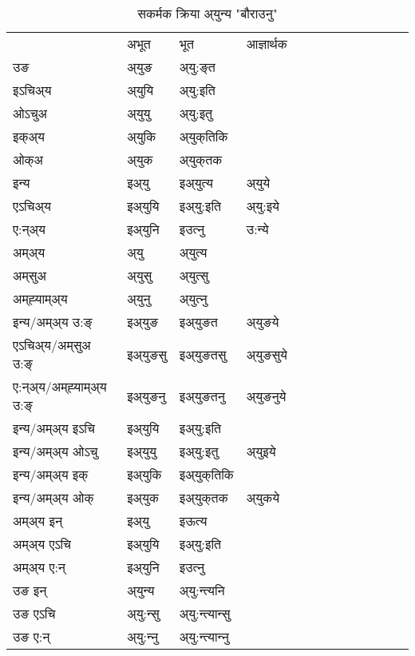 \begin{table}[H]
\centering
\caption{\label{u.vt} सकर्मक क्रिया  अ्युन्य  "बौराउनु"  }
\begin{tabular}{l|l|l|l|l|l|l|l|l|l|l|l|l}  \toprule
&अभूत & भूत & आज्ञार्थक \\ 
उङ &अ्युङ &अ्यु:ङ्‌त \\ 
इऽचिअ्य &अ्युयि &अ्यु:इति   \\ 
ओऽचुअ &अ्युयु &अ्यु:इतु   \\ 
इक्अ्य &अ्युकि &अ्युक्‌तिकि   \\ 
ओक्अ &अ्युक &अ्युक्‌तक   \\ 
इन्य & इअ्यु & इअ्युत्य &अ्युये  \\ 
एऽचिअ्य & इअ्युयि & इअ्यु:इति &अ्यु:इये    \\ 
ए:न्अ्य & इअ्युनि  & इउत्‍नु &उ:न्ये  \\ 
अम्अ्य & अ्यु & अ्युत्य   \\ 
अम्‌सुअ & अ्युसु & अ्युत्सु     \\ 
अम्‌ह्‍याम्अ्य & अ्युनु  & अ्युत्‍नु \\ 
\midrule
इन्य/अम्अ्य उ:ङ्‌&इअ्युङ &इअ्युङत &अ्युङये \\ 
एऽचिअ्य/अम्‌सुअ उ:ङ्‌ &इअ्युङसु &इअ्युङतसु &अ्युङसुये \\ 
ए:न्अ्य/अम्‌ह्‍याम्अ्य उ:ङ्‌ &इअ्युङनु &इअ्युङतनु &अ्युङनुये \\ 
इन्य/अम्अ्य इऽचि &इअ्युयि &इअ्यु:इति    \\ 
इन्य/अम्अ्य ओऽचु &इअ्युयु &इअ्यु:इतु  &अ्युइये  \\ 
इन्य/अम्अ्य इक् &इअ्युकि &इअ्युक्‌तिकि   \\ 
इन्य/अम्अ्य ओक् &इअ्युक &इअ्युक्‌तक  &अ्युकये  \\ 
अम्अ्य इन् & इअ्यु & इऊत्य   \\ 
अम्अ्य एऽचि & इअ्युयि & इअ्यु:इति     \\ 
अम्अ्य ए:न् & इअ्युनि  & इउत्‍नु  \\ 
\midrule
उङ इन् & अ्युन्य  & अ्यु:न्त्यनि  \\ 
उङ एऽचि & अ्यु:न्सु  & अ्यु:न्त्यान्सु   \\ 
उङ ए:न्& अ्यु:न्‍नु  & अ्यु:न्त्यान्‍नु   \\ 
\bottomrule
\end{tabular}
\end{table}


